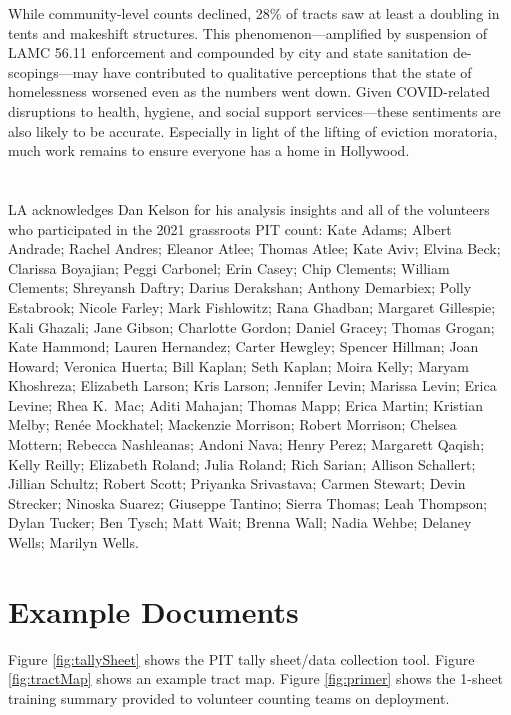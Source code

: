 \documentclass[11pt,twocolumn]{article}
\def\Count{count}
\begin{document}
While community-level counts declined, 28\% of tracts saw at least a doubling in tents and 
makeshift structures. This phenomenon---amplified by suspension of LAMC 56.11 enforcement
and compounded by city and state sanitation de-scopings---may have contributed to qualitative 
perceptions that the state of homelessness worsened even as the numbers went down. Given 
COVID-related disruptions to health, hygiene, and social support services---these sentiments are also 
likely to be accurate. Especially in light of the lifting of eviction moratoria, much work remains to 
ensure everyone has a home in Hollywood.

\section*{}

LA acknowledges Dan Kelson for his analysis insights and all of the volunteers who participated
in the 2021 grassroots PIT \Count: Kate Adams;
Albert Andrade;
Rachel Andres;
Eleanor Atlee;
Thomas Atlee; 
Kate Aviv;
Elvina Beck; 
Clarissa Boyajian;
Peggi Carbonel;
Erin Casey;
Chip Clements;
William Clements;
Shreyansh Daftry;
Darius Derakshan;
Anthony Demarbiex;
Polly Estabrook;
Nicole Farley;
Mark Fishlowitz; 
Rana Ghadban;
Margaret Gillespie; 
Kali Ghazali;
Jane Gibson;
Charlotte Gordon;
Daniel Gracey;
Thomas Grogan;
Kate Hammond;
Lauren Hernandez;
Carter Hewgley;
Spencer Hillman;
Joan Howard;
Veronica Huerta;
Bill Kaplan;
Seth Kaplan;
Moira Kelly; 
Maryam Khoshreza;
Elizabeth Larson;
Kris Larson;
Jennifer Levin;
Marissa Levin;
Erica Levine;
Rhea K.~Mac;
Aditi Mahajan;
Thomas Mapp;
Erica Martin;
Kristian Melby;
Ren\'{e}e Mockhatel;
Mackenzie Morrison;
Robert Morrison;
Chelsea Mottern;
Rebecca Nashleanas;
Andoni Nava;
Henry Perez;
Margarett Qaqish;
Kelly Reilly;
Elizabeth Roland;
Julia Roland;
Rich Sarian;
Allison Schallert; 
Jillian Schultz;
Robert Scott;
Priyanka Srivastava;
Carmen Stewart;
Devin Strecker; 
Ninoska Suarez;
Giuseppe Tantino;
Sierra Thomas; 
Leah Thompson; 
Dylan Tucker;
Ben Tysch; 
Matt Wait;
Brenna Wall;
Nadia Wehbe;
Delaney Wells;
Marilyn Wells.

\appendix

\section{Example Documents}

Figure \ref{fig:tallySheet} shows the PIT tally sheet/data collection tool. Figure \ref{fig:tractMap} shows
an example tract map. Figure \ref{fig:primer} shows the 1-sheet training summary provided to volunteer
counting teams on deployment.
\end{document}

